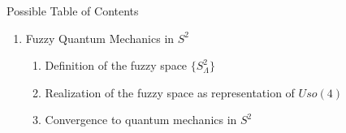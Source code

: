 \begin{frame}{Possible Table of Contents}
\begin{enumerate}
\begin{enumerate}
\begin{enumerate}
            
            \item Realization of the fuzzy space as representation of $Uso(3)$
            
            \item Convergence to quantum mechanics in $S^1$
            
            \end{enumerate}
        
        \item Fuzzy Quantum Mechanics in $S^2$
            
            \begin{enumerate}\tiny
                
            \item Definition of the fuzzy space $\{S^2_\Lambda\}$
            
            
            \item Realization of the fuzzy space as representation of $Uso(4)$
            
            \item Convergence to quantum mechanics in $S^2$
            
            \end{enumerate}
            
        \end{enumerate}
    
    \end{enumerate}
\end{frame}

    
        
        
           
        
            
    
            
            
        
      

